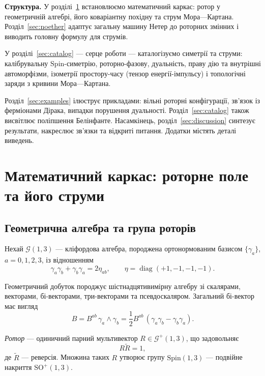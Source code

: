 \documentclass[11pt,a4paper]{article}
\numberwithin{equation}{section}
\theoremstyle{plain}
\theoremstyle{definition}
\theoremstyle{remark}
\DeclareMathOperator{\diag}{diag}
\begin{document}
\textbf{Структура.} У розділі~\ref{sec:setup} встановлюємо математичний каркас: ротор у геометричній алгебрі, його коваріантну похідну та струм Мора—Картана. Розділ~\ref{sec:noether} адаптує загальну машину Нетер до роторних змінних і виводить головну формулу для струмів.

У розділі~\ref{sec:catalog} — серце роботи — каталогізуємо симетрії та струми: калібрувальну $\mathrm{Spin}$-симетрію, роторно-фазову, дуальність, праву дію та внутрішні автоморфізми, ізометрії простору-часу (тензор енергії-імпульсу) і топологічні заряди з кривини Мора—Картана.

Розділ~\ref{sec:examples} ілюструє прикладами: вільні роторні конфігурації, зв'язок із ферміонами Дірака, випадки порушення дуальності. Розділ~\ref{sec:catalog} також висвітлює поліпшення Белінфанте. Насамкінець, розділ~\ref{sec:discussion} синтезує результати, накреслює зв'язки та відкриті питання. Додатки містять деталі виведень.

\section{Математичний каркас: роторне поле та його струми}
\label{sec:setup}

\subsection{Геометрична алгебра та група роторів}

Нехай $\mathcal{G}(1,3)$ — кліфордова алгебра, породжена ортонормованим базисом $\{\gamma_a\}$, $a=0,1,2,3$, із відношенням
\begin{equation}
\gamma_a\gamma_b+\gamma_b\gamma_a=2\eta_{ab}, \qquad \eta=\diag(+1,-1,-1,-1).
\end{equation}

Геометричний добуток породжує шістнадцятивимірну алгебру зі скалярами, векторами, бі-векторами, три-векторами та псевдоскаляром. Загальний бі-вектор має вигляд
\begin{equation}
B = B^{ab}\,\gamma_a\wedge\gamma_b = \frac{1}{2}B^{ab}\,(\gamma_a\gamma_b - \gamma_b\gamma_a).
\end{equation}

\emph{Ротор} — одиничний парний мультивектор $R \in \mathcal{G}^+(1,3)$, що задовольняє
\begin{equation}
R\widetilde{R} = 1,
\end{equation}
де $\widetilde{R}$ — реверсія. Множина таких $R$ утворює групу $\mathrm{Spin}(1,3)$ — подвійне накриття $\mathrm{SO}^+(1,3)$.
\end{document}
